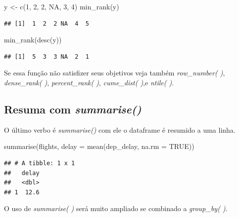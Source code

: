 \documentclass[
]{article}
\newenvironment{Shaded}{\begin{snugshade}}{\end{snugshade}}
\newcommand{\AttributeTok}[1]{\textcolor[rgb]{0.77,0.63,0.00}{#1}}
\newcommand{\ConstantTok}[1]{\textcolor[rgb]{0.00,0.00,0.00}{#1}}
\newcommand{\DecValTok}[1]{\textcolor[rgb]{0.00,0.00,0.81}{#1}}
\newcommand{\FunctionTok}[1]{\textcolor[rgb]{0.00,0.00,0.00}{#1}}
\newcommand{\NormalTok}[1]{#1}
\newcommand{\OtherTok}[1]{\textcolor[rgb]{0.56,0.35,0.01}{#1}}
\begin{document}
\begin{Shaded}
\begin{Highlighting}[]
\NormalTok{y }\OtherTok{\textless{}{-}} \FunctionTok{c}\NormalTok{(}\DecValTok{1}\NormalTok{, }\DecValTok{2}\NormalTok{, }\DecValTok{2}\NormalTok{, }\ConstantTok{NA}\NormalTok{, }\DecValTok{3}\NormalTok{, }\DecValTok{4}\NormalTok{)}
\FunctionTok{min\_rank}\NormalTok{(y)}
\end{Highlighting}
\end{Shaded}

\begin{verbatim}
## [1]  1  2  2 NA  4  5
\end{verbatim}

\begin{Shaded}
\begin{Highlighting}[]
\FunctionTok{min\_rank}\NormalTok{(}\FunctionTok{desc}\NormalTok{(y))}
\end{Highlighting}
\end{Shaded}

\begin{verbatim}
## [1]  5  3  3 NA  2  1
\end{verbatim}

Se essa função não satisfizer seus objetivos veja também
\emph{row\_number( )}, \emph{dense\_rank( )}, \emph{percent\_rank( )},
\emph{cume\_dist( )},e \emph{ntile( )}.

\hypertarget{resuma-com-summarise}{%
\subsection{\texorpdfstring{Resuma com
\emph{summarise()}}{Resuma com summarise()}}\label{resuma-com-summarise}}

O último verbo é \emph{summarise()} com ele o dataframe é resumido a uma
linha.

\begin{Shaded}
\begin{Highlighting}[]
\FunctionTok{summarise}\NormalTok{(flights, }\AttributeTok{delay =} \FunctionTok{mean}\NormalTok{(dep\_delay, }\AttributeTok{na.rm =} \ConstantTok{TRUE}\NormalTok{))}
\end{Highlighting}
\end{Shaded}

\begin{verbatim}
## # A tibble: 1 x 1
##   delay
##   <dbl>
## 1  12.6
\end{verbatim}

O uso de \emph{summarise( )} será muito ampliado se combinado a
\emph{group\_by( )}.
\end{document}
